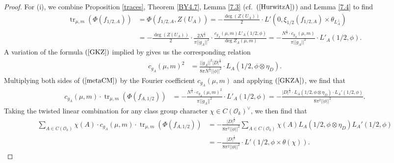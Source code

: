 \documentclass{amsart}
\theoremstyle{definition}
\theoremstyle{definition}
\theoremstyle{definition}
\begin{document}
\begin{proof}

For (i), we combine Proposition \ref{traces}, Theorem \ref{BY4.7}, Lemma \ref{7.3} (cf.~$(\ref{HurwitzA})$) and Lemma \ref{7.4} to find  
\begin{equation}\begin{aligned}\label{metaCM} \operatorname{tr}_{\mu, m}(\Phi(f_{1/2, A})) 
&= \Phi(f_{1/2, A}, Z(U_A)) = - \frac{\deg(Z(U_A))}{2} \cdot L'(0, \xi_{1/2}(f_{1/2, A}) \times \theta_{L_A^{\perp}}) \\
&= - \frac{\deg(Z(U_A))}{2} \cdot \frac{2 N^{\frac{1}{2}}}{  \pi \vert \vert g_A \vert \vert^2 } \cdot \frac{c_{g_A}(\mu,m) L'_A(1/2, \phi)}{\deg Z_A(\mu, m)} 
= -\frac{N^{\frac{1}{2}} \cdot c_{g_A}(\mu,m) }{  \pi \vert \vert g_A \vert \vert^2 } \cdot  L'_A(1/2, \phi). \end{aligned}\end{equation} 
A variation of the formula $(\ref{GKZ})$ implied by \cite[$\S$II.4, Corollary 1]{GKZ} gives us the corresponding relation
\begin{align}\label{GKZA} c_{g_A}(\mu, m)^2 &= \frac{\vert \vert g_A \vert \vert^2 \vert D \vert^{\frac{1}{2}}}{ 8 \pi N^{\frac{1}{2}} 
\vert \vert \phi \vert \vert^2} \cdot L_A(1/2, \phi \otimes \eta_D). \end{align}
Multiplying both sides of $(\ref{metaCM})$ by the Fourier coefficient $c_{g_A}(\mu, m)$ and applying $(\ref{GKZA})$, we find that 
\begin{equation*}\begin{aligned} c_{g_A}(\mu, m) \cdot \operatorname{tr}_{\mu, m} \left( \Phi(f_{A, 1/2}) \right) 
&=  -\frac{N^{\frac{1}{2}} \cdot c_{g_A}(\mu,m)^2 }{ \pi \vert \vert g_A \vert \vert^2 } \cdot  L'_A(1/2, \phi) 
= - \frac{ \vert D \vert^{\frac{1}{2}} \cdot L_A(1/2, \phi \otimes \eta_D) \cdot L_A'(1/2, \phi) }{ 8 \pi^2 \vert \vert \phi \vert \vert^2 }. \end{aligned}\end{equation*}
Taking the twisted linear combination for any class group character $\chi \in C(\mathcal{O}_k)^{\vee}$, we then find that 
\begin{equation*}\begin{aligned} \sum\limits_{A \in C(\mathcal{O}_k)} \chi(A) \cdot c_{g_A}(\mu, m) \cdot \operatorname{tr}_{\mu, m} \left( \Phi(f_{A, 1/2}) \right) 
&= - \frac{ \vert D \vert^{\frac{1}{2}}}{ 8 \pi^2 \vert \vert \phi \vert \vert^2  }  \sum\limits_{A \in C(\mathcal{O}_k)} \chi(A) L_A(1/2, \phi \otimes \eta_D) L_A'(1/2, \phi) \\
&= - \frac{ \vert D \vert^{\frac{1}{2}}}{ 8 \pi^2 \vert \vert \phi \vert \vert^2  } \cdot L'(1/2, \phi \times \theta(\chi)). \end{aligned}\end{equation*}


\end{proof}
\end{document}
